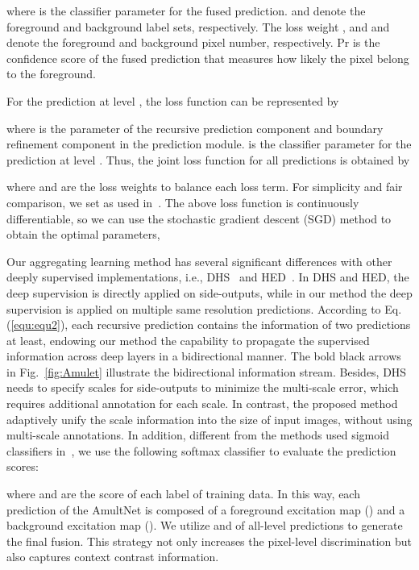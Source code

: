 \documentclass[10pt,twocolumn,letterpaper]{article}
\begin{document}
where  is the classifier parameter for the fused prediction.
 and  denote the foreground and background label sets, respectively.
The loss weight , and  and  denote the foreground and background pixel number, respectively.
Pr is the confidence score of the fused prediction that measures how likely the pixel belong to the foreground.


For the prediction at level , the loss function can be represented by

where  is the parameter of the recursive prediction component and boundary refinement component in the prediction module.
 is the classifier parameter for the prediction at level .
Thus, the joint loss function for all predictions is obtained by

where  and  are the loss weights to balance each loss term. For simplicity and fair comparison, we set  as used in~\cite{xie2015holistically}.
The above loss function is continuously differentiable, so we can use the stochastic gradient descent (SGD) method to obtain the optimal parameters,


Our aggregating learning method has several significant differences with other deeply supervised implementations, i.e., DHS~\cite{liu2016dhsnet} and HED~\cite{xie2015holistically}.
In DHS and HED, the deep supervision is directly applied on side-outputs, while in our method the deep supervision is applied on multiple same resolution predictions.
According to Eq.(\ref{equ:equ2}), each recursive prediction contains the information of two predictions at least, endowing our method the capability to propagate the supervised information across deep layers in a bidirectional manner.
The bold black arrows in Fig.~\ref{fig:Amulet} illustrate the bidirectional information stream.
Besides, DHS needs to specify scales for side-outputs to minimize the multi-scale error, which requires additional annotation for each scale.
In contrast, the proposed method adaptively unify the scale information into the size of input images, without using multi-scale
annotations.
In addition, different from the methods used sigmoid classifiers in~\cite{liu2016dhsnet,xie2015holistically}, we use the following softmax classifier to evaluate the prediction scores:


where  and  are the score of each label of training data. In this way, each prediction of the AmultNet is composed of a foreground excitation map () and a background excitation map ().
We utilize  and  of all-level predictions to generate the final fusion.
This strategy not only increases the pixel-level discrimination but also captures context contrast information.
\end{document}
